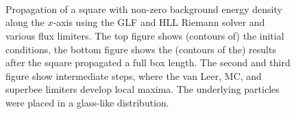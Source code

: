 \begin{figure}
 \centering
 \\
 \\
 \\
 \caption{
Propagation of a square with non-zero background energy density along the $x$-axis using the GLF
and HLL Riemann solver and various flux limiters. The top figure shows (contours of) the initial
conditions, the bottom figure shows the (contours of the) results after the square propagated a
full box length. The second and third figure show intermediate steps, where the van Leer, MC, and
superbee limiters develop local maxima. The underlying particles were placed in a glass-like
distribution.
 }
 \label{fig:rt-riemann-limiter-2D-Group1-glass}
\end{figure}



